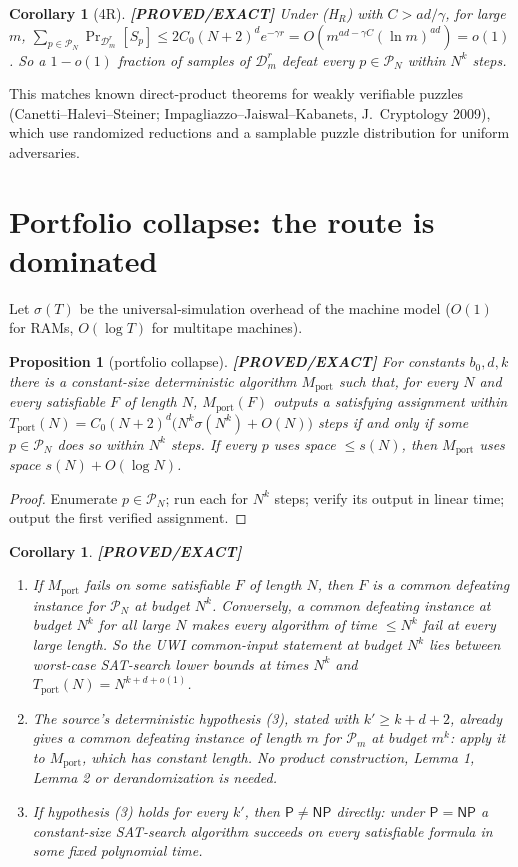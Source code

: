 \documentclass[11pt]{article}
\newtheorem{proposition}[theorem]{Proposition}
\newtheorem{corollary}[theorem]{Corollary}
\theoremstyle{remark}
\newcommand{\cP}{\mathsf{P}}
\newcommand{\NP}{\mathsf{NP}}
\newcommand{\D}{\mathcal{D}}
\newcommand{\PN}{\mathcal{P}_N}
\newcommand{\status}[1]{\textbf{[#1]}}
\begin{document}
\begin{corollary}[4R] \status{PROVED/EXACT}
Under (H$_R$) with $C>ad/\gamma$, for large $m$,
$\sum_{p\in\PN}\Pr_{\D_m^r}[S_p]\le 2C_0(N+2)^de^{-\gamma r}=O(m^{ad-\gamma C}(\ln m)^{ad})=o(1)$.
So a $1-o(1)$ fraction of samples of $\D_m^r$ defeat every $p\in\PN$ within $N^k$ steps.
\end{corollary}

\noindent This matches known direct-product theorems for weakly verifiable puzzles (Canetti--Halevi--Steiner;
Impagliazzo--Jaiswal--Kabanets, J.~Cryptology 2009), which use randomized reductions and a samplable
puzzle distribution for uniform adversaries.

\section{Portfolio collapse: the route is dominated}

Let $\sigma(T)$ be the universal-simulation overhead of the machine model ($O(1)$ for RAMs, $O(\log T)$
for multitape machines).

\begin{proposition}[portfolio collapse]\label{prop:collapse} \status{PROVED/EXACT}
For constants $b_0,d,k$ there is a constant-size deterministic algorithm $M_{\mathrm{port}}$ such that, for
every $N$ and every satisfiable $F$ of length $N$, $M_{\mathrm{port}}(F)$ outputs a satisfying assignment
within $T_{\mathrm{port}}(N)=C_0(N+2)^d\bigl(N^k\sigma(N^k)+O(N)\bigr)$ steps if and only if some
$p\in\PN$ does so within $N^k$ steps. If every $p$ uses space $\le s(N)$, then $M_{\mathrm{port}}$ uses space
$s(N)+O(\log N)$.
\end{proposition}
\begin{proof}
Enumerate $p\in\PN$; run each for $N^k$ steps; verify its output in linear time; output the first verified
assignment.
\end{proof}

\begin{corollary}\label{cor:dominated} \status{PROVED/EXACT}
\begin{enumerate}
\item If $M_{\mathrm{port}}$ fails on some satisfiable $F$ of length $N$, then $F$ is a common defeating
instance for $\PN$ at budget $N^k$. Conversely, a common defeating instance at budget $N^k$ for all large
$N$ makes every algorithm of time $\le N^k$ fail at every large length. So the UWI common-input
statement at budget $N^k$ lies between worst-case SAT-search lower bounds at times $N^k$ and
$T_{\mathrm{port}}(N)=N^{k+d+o(1)}$.
\item The source's deterministic hypothesis (3), stated with $k'\ge k+d+2$, already gives a common
defeating instance of length $m$ for $\mathcal{P}_m$ at budget $m^k$: apply it to $M_{\mathrm{port}}$,
which has constant length. No product construction, Lemma 1, Lemma 2 or derandomization is needed.
\item If hypothesis (3) holds for every $k'$, then $\cP\neq\NP$ directly: under $\cP=\NP$ a
constant-size SAT-search algorithm succeeds on every satisfiable formula in some fixed polynomial time.
\end{enumerate}
\end{corollary}
\end{document}
